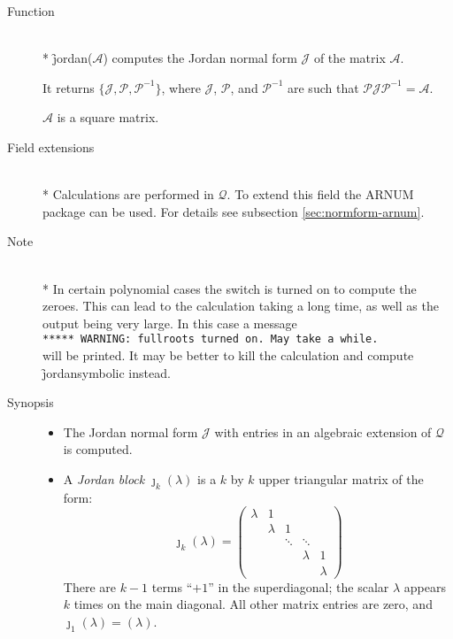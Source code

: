\begin{description}
\item[Function]\mbox{}\\*
%
\f{jordan}($\mathcal{A}$) computes the Jordan normal form 
$\mathcal{J}$ of the matrix $\mathcal{A}$.

It returns $\{\mathcal{J}, \mathcal{P}, \mathcal{P}^{-1}\}$, where 
$\mathcal{J}$, $\mathcal{P}$, and $\mathcal{P}^{-1}$ are such that $\mathcal{P J P}^
{-1} = \mathcal{A}$. 

$\mathcal{A}$ is a square matrix.

\item[Field extensions]\mbox{}\\*
%
Calculations are performed in $\mathcal{Q}$. To extend this field the 
{\small ARNUM} package can be used. For details see subsection \ref{sec:normform-arnum}.

\item[Note]\mbox{}\\*
In certain polynomial cases the switch  is turned on to compute the 
zeroes. This can lead to the calculation taking a long time, as well as 
the output being very large. In this case a message \\
\verb|***** WARNING: fullroots turned on. May take a while.|\\
will be printed. It may be 
better to kill the calculation and compute \f{jordansymbolic} instead.

\item[Synopsis]

\begin{itemize}
\item The Jordan normal form $\mathcal{J}$ with entries in an algebraic 
      extension of $\mathcal{Q}$ is computed.

\item A \emph{Jordan block} ${\jmath}_{k}(\lambda)$ is a $k$ by $k$ 
      upper triangular matrix of the form:
%
      \begin{displaymath}
      {\jmath}_{k}(\lambda) = \begin{pmatrix} \lambda & 1 
      &  &  & \\  &  \lambda & 1  & & \\ & 
      & \ddots & \ddots & \\ &  &  &  \lambda & 1 \\ &
      &  &  & \lambda \end{pmatrix} 
      \end{displaymath}
%      
      There are $k-1$ terms ``$+1$'' in the superdiagonal; the scalar 
      $\lambda$ appears $k$ times on the main diagonal. All other 
      matrix entries are zero, and ${\jmath}_{1}(\lambda) = (\lambda)$.


\end{itemize}
\end{description}
